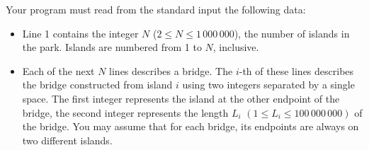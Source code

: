 Your program must read from the standard input the following data:
\begin{itemize}
\item Line 1 contains the integer $N$ ($2 \le N \le 1\,000\,000$), the number of islands in the park. Islands are numbered from 1 to $N$, inclusive.
\item Each of the next $N$ lines describes a bridge. The $i$-th of these lines describes the bridge constructed from island $i$ using two integers separated by a single space. The first integer represents the island at the other endpoint of the bridge, the second integer represents the length $L_i$ $(1 \le L_i \le 100\,000\,000)$ of the bridge. You may assume that for each bridge, its endpoints are always on two different islands.
\end{itemize}